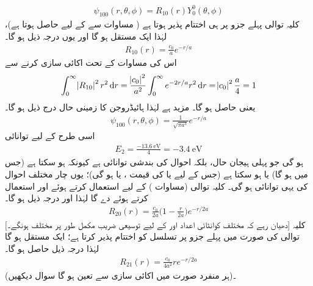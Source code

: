  \begin{align}
\psi_{100}(r,\theta,\phi)=R_{10}(r)Y_{0}^{0}(\theta,\phi) 
\end{align}
 کلیہ توالی پہلے جزو پر ہی اختتام پذیر ہوتا ہے ( مساوات  سے  کے لیے  حاصل ہوتا ہے)، لہٰذا  ایک مستقل  ہو گا اور یوں درجہ ذیل ہو گا۔
 \begin{align}
R_{10}(r)=\frac{c_{0}}{a}e^{-r/a} 
\end{align}
 اس کی مساوات  کے تحت اکائی سازی کرنے سے
\begin{align*}
\int_{0}^{\infty}\abs{R_{10}}^{2}r^{2}\dif{r}=\frac{\abs{c_0}^{2}}{a^{2}}\int_{0}^{\infty}e^{-2r/a}r^{2}\dif{r}=\abs{c_{0}}^{2}\frac{a}{4}=1 
\end{align*}
یعنی  حاصل ہو گا۔ مزید  ہے لہٰذا ہائیڈروجن کا زمینی حال درج ذیل ہو گا۔
\begin{align}\label{مساوات_تین_ابعاد_زمینی_ہائیڈروجن}
\psi_{100}(r,\theta,\phi)=\frac{1}{\sqrt{\pi a^{3}}}e^{-r/a} 
\end{align}
اسی طرح  کے لیے توانائی
\begin{align}
E_{2}=\frac{\SI{-13.6}{\electronvolt}}{4}=\SI{-3.4}{\electronvolt}
\end{align}
ہو گی جو پہلی ہیجان حال، بلکہ احوال کی بندشی توانائی ہے کیونکہ  ہو سکتا ہے (جس میں  ہو گا) یا  ہو سکتا ہے (جس کے لیے یا  کی قیمت ،  یا  ہو گی)؛ یوں چار مختلف احوال کی یہی توانائی ہو گی۔
 کلیہ توالی (مساوات )  کے لیے  استعمال کرتے ہوئے  اور  استعمال کرتے ہوئے  دے گا لہٰذا  اور درجہ ذیل ہو گا۔
 \begin{align}\label{مساوات_تین_ابعادی_رداسی_بیس}
R_{20}(r)=\frac{c_{0}}{2a}\big(1-\frac{r}{2a}\big)e^{-r/2a} 
\end{align}
[دھیان رہے کہ مختلف کوانٹائی اعداد  اور  کے لیے توسیعی  ضریب   مکمل طور پر مختلف ہونگے۔] کلیہ توالی 
  کی صورت میں پہلے جزو پر تسلسل کو اختتام پذیر کرتا ہے؛  ایک مستقل ہو گا لہٰذا درجہ ذیل حاصل ہو گا۔
 \begin{align}\label{مساوات_تین_ابعادی_رداسی_اکیس}
R_{21}(r)=\frac{c_{0}}{4a^{2}}re^{-r/2a} 
\end{align}
(ہر منفرد صورت میں  اکائی سازی سے تعین ہو گا سوال  دیکھیں)۔

